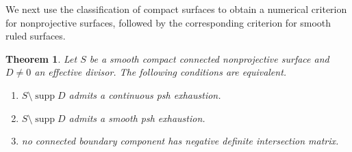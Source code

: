 \documentclass[11pt]{amsart}
\newtheorem{theorem}{Theorem}[section]
\theoremstyle{definition}
\theoremstyle{remark}
\numberwithin{equation}{section}
\newcommand{\supp}{\operatorname{supp}}
\begin{document}
We next use the classification of compact surfaces to obtain a numerical
criterion for nonprojective surfaces, followed by the corresponding
criterion for smooth ruled surfaces.

\begin{theorem}\label{thm:nonprojective}
Let $S$ be a smooth compact connected nonprojective surface and
$D\ne0$ an effective divisor. The following conditions are equivalent.
\begin{enumerate}[label=\textup{(\roman*)},leftmargin=2.5em]
\item $S\setminus\supp D$ admits a continuous psh exhaustion.
\item $S\setminus\supp D$ admits a smooth psh exhaustion.
\item no connected boundary component has negative definite
intersection matrix.
\end{enumerate}
\end{theorem}
\end{document}
